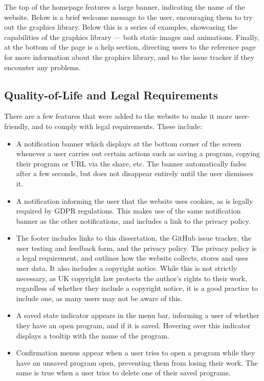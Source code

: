 \documentclass[../main.tex]{subfiles}
\begin{document}
            The top of the homepage features a large banner, indicating the name of the
                website.
            Below is a brief welcome message to the user, encouraging them to try out the
                graphics library.
            Below this is a series of examples, showcasing the capabilities of the graphics
                library — both static images and animations.
            Finally, at the bottom of the page is a help section, directing users to the
                reference page for more information about the graphics library, and to the
                issue tracker if they encounter any problems.

        \subsection{Quality-of-Life and Legal Requirements}
            There are a few features that were added to the website to make it more
                user-friendly, and to comply with legal requirements.
            These include:
            \begin{itemize}
                \item A notification banner which displays at the bottom corner of the screen
                      whenever a user carries out certain actions such as saving a program, copying
                      their program or URL via the share, etc.
                      The banner automatically fades after a few seconds, but does not disappear
                          entirely until the user dismisses it.
                \item A notification informing the user that the website uses cookies, as is legally
                      required by GDPR regulations.
                      This makes use of the same notification banner as the other notifications, and
                          includes a link to the privacy policy.
                \item The footer includes links to this dissertation, the GitHub issue tracker,
                      the user testing and feedback form, and the privacy policy.
                      The privacy policy is a legal requirement, and outlines how the website
                          collects, stores and uses user data.
                      It also includes a copyright notice.
                      While this is not strictly necessary, as UK copyright law protects the author's
                          rights to their work, regardless of whether they include a copyright notice, it
                          is a good practice to include one, as many users may not be aware of this.
                \item A saved state indicator appears in the menu bar, informing a user of whether
                      they have an open program, and if it is saved.
                      Hovering over this indicator displays a tooltip with the name of the program.
                \item Confirmation menus appear when a user tries to open a program while they
                      have an unsaved program open, preventing them from losing their work.
                      The same is true when a user tries to delete one of their saved programs.
            \end{itemize}
\end{document}
